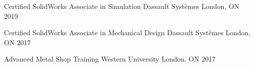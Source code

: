 \begin{cvawards}

  \cvaward
    {Certified SolidWorks Associate in Simulation} %
    {Dassault Systèmes} %
    {London, ON} %
    {2019} %

  \cvaward
    {Certified SolidWorks Associate in Mechanical Design} %
    {Dassault Systèmes} %
    {London, ON} %
    {2017} %

  \cvaward
    {Advanced Metal Shop Training} %
    {Western University} %
    {London, ON} %
    {2017} %

\end{cvawards}
